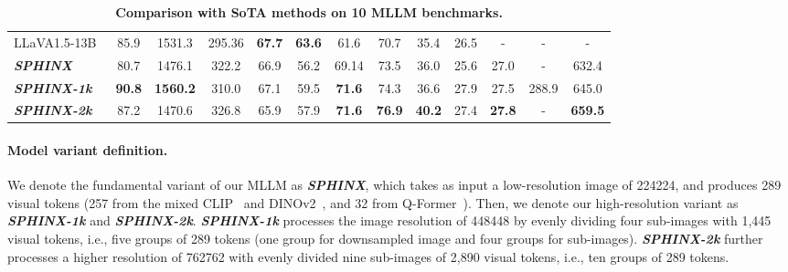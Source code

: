 \documentclass{article} \usepackage{iclr2024_conference,times}
\newcommand{\sphinx}{\textcolor{Goldenrod3}{\textbf{\textit{SPHINX}}}~}
\newcommand{\sphinxonek}{\textcolor{Goldenrod3}{\textbf{\textit{SPHINX-1k}}}~}
\newcommand{\sphinxtwok}{\textcolor{Goldenrod3}{\textbf{\textit{SPHINX-2k}}}~}
\begin{document}
\begin{table}[]
{\begin{tabular}{l|cccccccccccc}
LLaVA1.5-13B~\citep{Liu2023ImprovedBW}                 & 85.9          & 1531.3          & 295.36          & \textbf{67.7} & \textbf{63.6} & 61.6           & 70.7          & 35.4          & 26.5          & -    & - & -           \\
\cmidrule(lr){1-1}\cmidrule(lr){2-13}
\rowcolor[gray]{0.95}
\sphinx                      & 80.7          & 1476.1          & 322.2           & 66.9          & 56.2          & 69.14          & 73.5          & 36.0          & 25.6          & 27.0  & - & 632.4         \\
\rowcolor[gray]{0.95}
\sphinxonek                 & \textbf{90.8} & \textbf{1560.2} & 310.0           & 67.1          & 59.5          & \textbf{71.6}  & 74.3           & 36.6 & 27.9          & 27.5 & 288.9 & 645.0 \\
\rowcolor[gray]{0.95}
\sphinxtwok                 & 87.2           & 1470.6           & 326.8          &   65.9             &   57.9           & \textbf{71.6} & \textbf{76.9}  &   \textbf{40.2}             &     27.4     &  \textbf{27.8} & - & \textbf{659.5} \\
\bottomrule
\end{tabular}
} \caption{\textbf{Comparison with SoTA methods on 10 MLLM benchmarks.}}
\label{table:mm}
\end{table}

\paragraph{Model variant definition.} We denote the fundamental variant of our MLLM as \textcolor{Goldenrod3}{\textbf{\textit{SPHINX}}}, which takes as input a low-resolution image of 224224, and produces 289 visual tokens (257 from the mixed CLIP~\citep{radford2021learning} and DINOv2~\citep{oquab2023dinov2}, and 32 from Q-Former~\citep{li2023blip}). Then, we denote our high-resolution variant as \textcolor{Goldenrod3}{\textbf{\textit{SPHINX-1k}}} and \textcolor{Goldenrod3}{\textbf{\textit{SPHINX-2k}}}. \textcolor{Goldenrod3}{\textbf{\textit{SPHINX-1k}}} processes the image resolution of 448448 by evenly dividing four sub-images with 1,445 visual tokens, i.e., five groups of 289 tokens (one group for downsampled image and four groups for sub-images). \textcolor{Goldenrod3}{\textbf{\textit{SPHINX-2k}}} further processes a higher resolution of 762762 with evenly divided nine sub-images of 2,890 visual tokens, i.e., ten groups of 289 tokens. 
\end{document}
